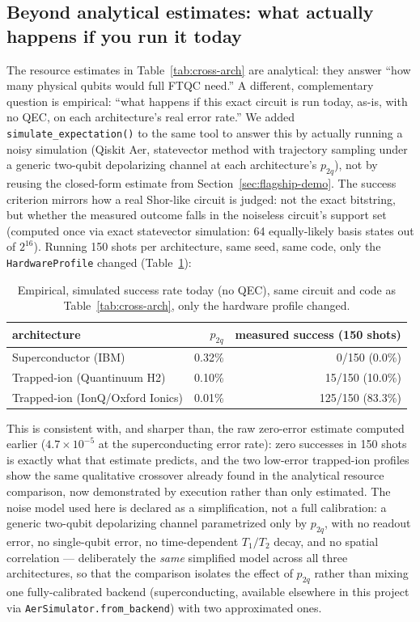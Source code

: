 \documentclass[9pt,twocolumn]{extarticle}
\begin{document}
\subsection{Beyond analytical estimates: what actually happens if you run it today}
The resource estimates in Table~\ref{tab:cross-arch} are analytical: they
answer ``how many physical qubits would full FTQC need.'' A different,
complementary question is empirical: ``what happens if this exact circuit
is run today, as-is, with no QEC, on each architecture's real error
rate.'' We added \texttt{simulate\_expectation()} to the same tool to
answer this by actually running a noisy simulation (Qiskit Aer,
statevector method with trajectory sampling under a generic two-qubit
depolarizing channel at each architecture's $p_{2q}$), not by reusing the
closed-form estimate from Section~\ref{sec:flagship-demo}. The success
criterion mirrors how a real Shor-like circuit is judged: not the exact
bitstring, but whether the measured outcome falls in the noiseless
circuit's support set (computed once via exact statevector simulation:
64 equally-likely basis states out of $2^{16}$). Running 150 shots per
architecture, same seed, same code, only the \texttt{HardwareProfile}
changed (Table~\ref{tab:sim-expectation}):
\begin{table}[h]
\centering
\begin{tabular}{lrr}
\toprule
architecture & $p_{2q}$ & measured success (150 shots) \\
\midrule
Superconductor (IBM) & 0.32\% & 0/150 (0.0\%) \\
Trapped-ion (Quantinuum H2) & 0.10\% & 15/150 (10.0\%) \\
Trapped-ion (IonQ/Oxford Ionics) & 0.01\% & 125/150 (83.3\%) \\
\bottomrule
\end{tabular}
\caption{Empirical, simulated success rate today (no QEC), same circuit
and code as Table~\ref{tab:cross-arch}, only the hardware profile changed.}
\label{tab:sim-expectation}
\end{table}
This is consistent with, and sharper than, the raw zero-error estimate
computed earlier ($4.7\times10^{-5}$ at the superconducting error rate):
zero successes in 150 shots is exactly what that estimate predicts, and
the two low-error trapped-ion profiles show the same qualitative
crossover already found in the analytical resource comparison, now
demonstrated by execution rather than only estimated. The noise model
used here is declared as a simplification, not a full calibration: a
generic two-qubit depolarizing channel parametrized only by $p_{2q}$, with
no readout error, no single-qubit error, no time-dependent $T_1/T_2$
decay, and no spatial correlation --- deliberately the \emph{same}
simplified model across all three architectures, so that the comparison
isolates the effect of $p_{2q}$ rather than mixing one fully-calibrated
backend (superconducting, available elsewhere in this project via
\texttt{AerSimulator.from\_backend}) with two approximated ones.
\end{document}
